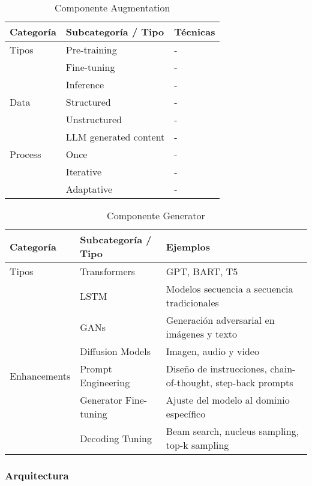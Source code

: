 \begin{table}[H]
\centering

\begin{tabularx}{\textwidth}{|l|l|>{\raggedright\arraybackslash}X|}
\hline
\textbf{Categoría} & \textbf{Subcategoría / Tipo} & \textbf{Técnicas} \\ \hline
Tipos   & Pre-training  & - \\ \hline
        & Fine-tuning   & - \\ \hline
        & Inference     & - \\ \hline
Data    & Structured    & - \\ \hline
        & Unstructured  & - \\ \hline
        & LLM generated content & - \\ \hline
Process & Once          & - \\ \hline
        & Iterative     & - \\ \hline
        & Adaptative    & - \\ \hline
\end{tabularx}
\caption{Componente Augmentation}
\end{table}

\begin{table}[H]
\centering


\begin{tabularx}{\textwidth}{|l|l|>{\raggedright\arraybackslash}X|}
\hline
\textbf{Categoría} & \textbf{Subcategoría / Tipo} & \textbf{Ejemplos} \\ \hline
Tipos & Transformers & GPT, BART, T5 \\ \hline
      & LSTM         & Modelos secuencia a secuencia tradicionales \\ \hline
      & GANs         & Generación adversarial en imágenes y texto \\ \hline
      & Diffusion Models & Imagen, audio y video \\ \hline
Enhancements & Prompt Engineering & Diseño de instrucciones, chain-of-thought, step-back prompts \\ \hline
             & Generator Fine-tuning & Ajuste del modelo al dominio específico \\ \hline
             & Decoding Tuning & Beam search, nucleus sampling, top-k sampling \\ \hline
\end{tabularx}
\caption{Componente Generator}
\end{table}

\subsubsection{Arquitectura}
